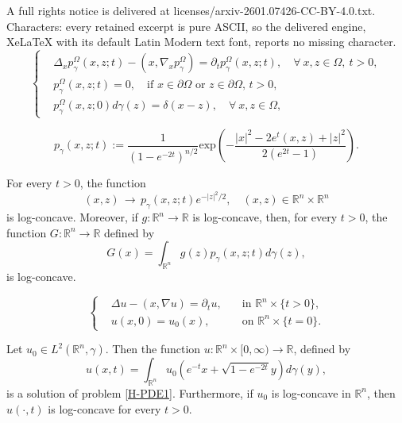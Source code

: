 \documentclass[10pt,a4paper]{amsart}
\newcommand{\R}{\mathbb R}
\begin{document}
A full rights notice is delivered at licenses/arxiv-2601.07426-CC-BY-4.0.txt. Characters: every retained excerpt is pure ASCII, so the delivered engine, XeLaTeX with its default Latin Modern text font, reports no missing character.
\begin{equation}\label{parabolic-equation1}
\left\{
\begin{aligned}
& \Delta_x p_\gamma^\Omega(x,z;t)-(x,\nabla_x p_\gamma^\Omega) =\partial_t p_\gamma^\Omega(x,z;t), \quad\forall\ x,z\in\Omega, \ t>0,  \\
& p_\gamma^\Omega(x,z;t)=0, \quad\mbox{if $x\in\partial\Omega$ or $z\in\partial\Omega$, $t>0$},  \\
& p_\gamma^\Omega(x,z;0)d\gamma(z)=\delta(x-z),  \quad  \forall\ x,z\in\Omega,
\end{aligned}
\right.
\end{equation}

\begin{equation}\label{heat-kernel-1}
p_\gamma(x,z;t):= \frac{1}{(1-e^{-2t})^{n/2}} \text{exp} \left( -\frac{|x|^2-2e^t (x,z)+|z|^2}{2(e^{2t}-1)}\right).
\end{equation}

\begin{proposition}\label{log-concavity proposition} For every $t>0$, the function
$$
(x,z)\, \rightarrow\,p_\gamma (x,z;t) e^{-|z|^2/2},\quad(x,z)\in\R^n\times\R^n
$$
is log-concave. Moreover, if $g\colon\R^n\to\R$ is log-concave, then, for every $t>0$, the function $G\colon\R^n\to\R$ defined by
$$
G(x)=\int_{\R^n} g(z)p_\gamma(x,z;t)d\gamma(z),
$$
is log-concave.
\end{proposition}

\begin{equation}\label{H-PDE1}
\left\{
\begin{aligned}
& \Delta u -(x,\nabla u)=\partial_t u, \quad & \mbox{in $\R^n\times \{t>0\}$,}\\
& u(x,0)=u_0(x),  \quad & \mbox{on $\R^n \times \{ t=0 \}$.}
\end{aligned}
\right.
\end{equation}

\begin{proposition}
Let $u_0\in L^2(\R^n,\gamma)$. Then the function $u\colon\R^n\times[0,\infty)\to\R$, defined by
\[
u(x,t)=\int_{\R^n} u_0(e^{-t}x+\sqrt{1-e^{-2t}}y) d\gamma(y),
\]
is a solution of problem \eqref{H-PDE1}. Furthermore, if $u_0$ is log-concave in $\R^n$, then $u(\cdot,t)$ is log-concave for every $t>0$.
\end{proposition}
\end{document}
